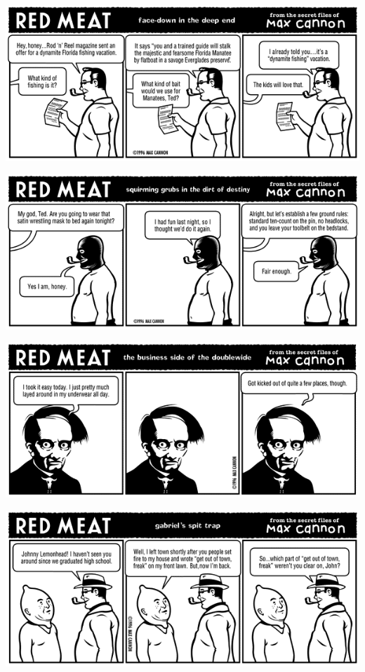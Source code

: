 \documentclass[a4paper,twoside,11pt]{article}
\begin{document}
\includegraphics[width=\textwidth]{redmeat_1996-07-08.png}



\includegraphics[width=\textwidth]{redmeat_1996-07-15.png}



\includegraphics[width=\textwidth]{redmeat_1996-07-22.png}



\includegraphics[width=\textwidth]{redmeat_1996-07-29.png}
\end{document}
